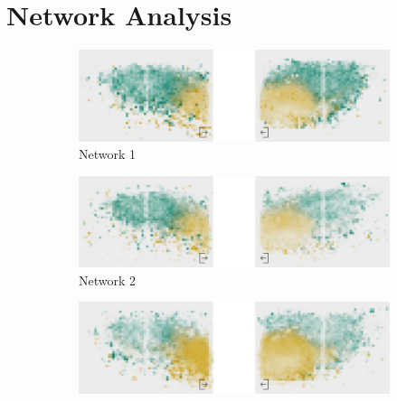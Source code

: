 \chapter{Network Analysis}
\label{app-analysis}

\begin{figure}[htb]
	\centering
	\begin{subfigure}[b]{1.0\textwidth}
		\centering
		\includegraphics[width=\textwidth]{Figures/le_network1}
		\caption[Network 1]{Network 1}
		\label{fig:le1}
		\vspace*{5mm}
	\end{subfigure}
	\begin{subfigure}[b]{1.0\textwidth}
		\includegraphics[width=\textwidth]{Figures/le_network2}
		\caption[Network 2]{Network 2}
		\label{fig:le2}
		\vspace*{5mm}
	\end{subfigure}
	\begin{subfigure}[b]{1.0\textwidth}
		\includegraphics[width=\textwidth]{Figures/le_network3}

\end{subfigure}
\end{figure}
